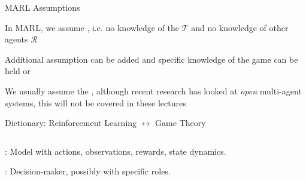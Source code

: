 \begin{frame}{MARL Assumptions}

\blist
    \item In MARL, we assume , i.e. no knowledge of the $\mathcal{T}$ and no knowledge of other agents $\mathcal{R}$
    \item Additional assumption can be added and specific knowledge of the game can be held or 
    \item We usually assume the , although recent research has looked at \textit{open} multi-agent systems, this will not be covered in these lectures 
\elist

\end{frame}

\begin{frame}{Dictionary: Reinforcement Learning \(\leftrightarrow\) Game Theory}
\centering

\begin{columns}[T]
    \begin{column}{0.5\textwidth}
        \vspace{5pt}
        \blist
            \item {}: Model with actions, observations, rewards, state dynamics.
            \item {}: Decision-maker, possibly with specific roles.
        \elist
    \end{column}



\end{columns}
\end{frame}
